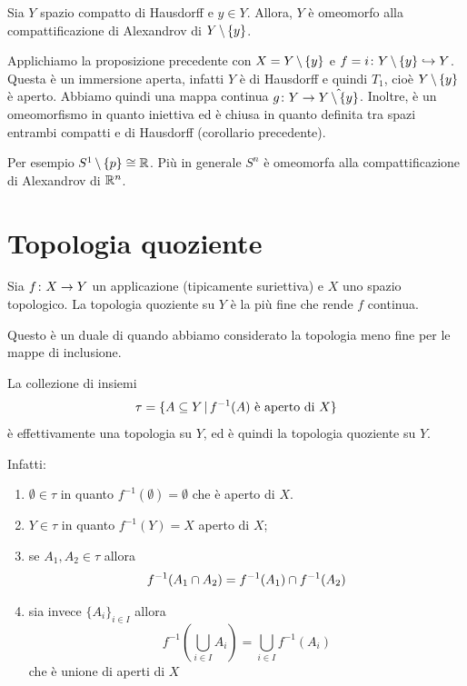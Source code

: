 \documentclass[a4paper]{article}
\begin{document}
\begin{snippetcorollary}{}
    Sia \(Y\) spazio compatto di Hausdorff
    e \(y \in Y\).
    Allora, \(Y\) è omeomorfo alla compattificazione
    di Alexandrov di \(Y\,\backslash\, \{y\}\).
\end{snippetcorollary}

\begin{snippetproof}{}
    Applichiamo la proposizione precedente
    con \(X = Y \,\backslash\, \{y\}\) e \(f = i \colon Y \,\backslash\, \{y\} \hookrightarrow Y\).
    Questa è un immersione aperta, infatti \(Y\) è di Hausdorff e quindi \(T_1\),
    cioè \(Y \,\backslash\, \{y\}\) è aperto.
    Abbiamo quindi una mappa continua \(g \colon Y \to \hat{Y \,\backslash\, \{y\}}\).
    Inoltre, è un omeomorfismo in quanto iniettiva ed è chiusa in quanto definita tra spazi entrambi
    compatti e di Hausdorff (corollario precedente).
\end{snippetproof}

Per esempio \(S^{1} \,\backslash\, \{p\} \cong \mathbb{R}\).
Più in generale \(S^n\) è omeomorfa alla compattificazione di Alexandrov di \(\mathbb{R}^n\).

\section{Topologia quoziente}

\begin{snippetdefinition}{}
    Sia \(f \colon X \to Y\) un applicazione (tipicamente suriettiva) e \(X\)
    uno spazio topologico. La topologia quoziente su \(Y\) è la più fine
    che rende \(f\) continua.
\end{snippetdefinition}

Questo è un duale di quando abbiamo considerato la topologia meno fine
per le mappe di inclusione.

La collezione di insiemi
\[
    \tau = 
    \{A \subseteq Y \,|\, f^{-1}(A) \text{ è aperto di } X\}
\]
è effettivamente una topologia su \(Y\), ed è quindi la topologia quoziente su \(Y\).

Infatti:
\begin{enumerate}
    \item \(\emptyset \in \tau\) in quanto \(f^{-1}(\emptyset) = \emptyset\) che è aperto di \(X\).
    \item \(Y \in \tau\) in quanto \(f^{-1}(Y) = X\) aperto di \(X\);
    \item se \(A_1, A_2 \in \tau\) allora \[f^{-1}(A_1 \cap A_2) = f^{-1}(A_1) \cap f^{-1}(A_2)\]
    \item sia invece \(\{A_i\}_{i\in I}\) allora
    \[
        f^{-1}\left(\bigcup_{i\in I} A_i\right)
        = \bigcup_{i\in I} f^{-1}(A_i)
    \]
    che è unione di aperti di \(X\)
\end{enumerate}
\end{document}
